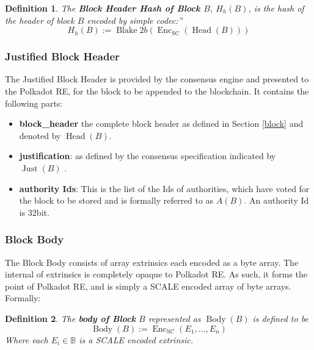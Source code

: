 \documentclass{book}
\newcommand{\assign}{:=}
\newcommand{\tmop}[1]{\ensuremath{\operatorname{#1}}}
\newcommand{\tmsamp}[1]{\textsf{#1}}
\newcommand{\tmstrong}[1]{\textbf{#1}}
\newcommand{\tmtextbf}[1]{{\bfseries{#1}}}
\newcommand{\tmtextsf}[1]{{\sffamily{#1}}}
\newtheorem{definition}{Definition}
\providecommand{\tmop}[1]{\ensuremath{\mathrm{#1}}}
\providecommand{\tmsamp}[1]{\tmtextsf{#1}}
\providecommand{\tmstrong}[1]{\tmtextbf{#1}}
\providecommand{\tmtextbf}[1]{\tmtextbf{#1}}
\newtheorem{definition}{Definition}
\begin{document}
\begin{definition}
  \label{defn-block-header-hash}The {\tmstrong{Block Header Hash of Block
  $B$}}, {\tmstrong{$H_h (B)$}}, is the hash of the header of block $B$
  encoded by simple codec:''
  \[ H_h (B) \assign \tmop{Blake} 2 b (\tmop{Enc}_{\tmop{SC}} (\tmop{Head}
     (B))) \]
\end{definition}

\subsubsection{Justified Block Header}

The Justified Block Header is provided by the consensus engine and presented
to the Polkadot RE, for the block to be appended to the blockchain. It
contains the following parts:
\begin{itemize}
  \item {\tmstrong{{\tmsamp{{\tmstrong{block\_header}}}}}} the complete block
  header as defined in Section \ref{block} and denoted by $\tmop{Head} (B)$.
  
  \item {\tmstrong{{\tmsamp{justification}}}}: as defined by the consensus
  specification indicated by $\tmop{Just} (B)$ {}.
  
  \item {\tmstrong{{\tmsamp{authority Ids}}}}: This is the list of the Ids of
  authorities, which have voted for the block to be stored and is formally
  referred to as $A (B)$. An authority Id is 32bit.
\end{itemize}
\subsubsection{Block Body}\label{sect-block-body}

The Block Body consists of array extrinsics each encoded as a byte array. The
internal of extrinsics is completely opaque to Polkadot RE. As such, it forms
the point of Polkadot RE, and is simply a SCALE encoded array of byte arrays.
Formally:

\begin{definition}
  \label{defn-block-body}The {\tmstrong{body of Block}} $B$ represented as
  {\tmstrong{$\tmop{Body} (B)$}} is defined to be
  \[ \tmop{Body} (B) \assign \tmop{Enc}_{\tmop{SC}} (E_1, \ldots, E_n) \]
  Where each $E_i \in \mathbb{B}$ is a SCALE encoded extrinsic.
\end{definition}
\end{document}
